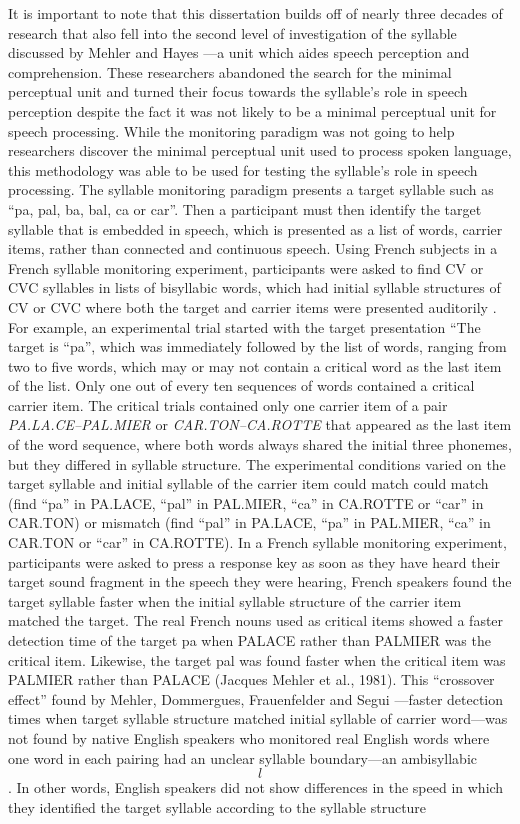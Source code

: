 It is important to note that this dissertation builds off of nearly three decades of research that also fell into the second level of investigation of the syllable discussed by Mehler and Hayes \parencite*{Mehler1981-wp}---a unit which aides speech perception and comprehension. These researchers abandoned the search for the minimal perceptual unit and turned their focus towards the syllable’s role in speech perception despite the fact it was not likely to be a minimal perceptual unit for speech processing. While the monitoring paradigm was not going to help researchers discover the minimal perceptual unit used to process spoken language, this methodology was able to be used for testing the syllable’s role in speech processing. The syllable monitoring paradigm presents a target syllable such as “pa, pal, ba, bal, ca or car”. Then a participant must then identify the target syllable that is embedded in speech, which is presented as a list of words, carrier items, rather than connected and continuous speech. Using French subjects in a French syllable monitoring experiment, participants were asked to find CV or CVC syllables in lists of bisyllabic words, which had initial syllable structures of CV or CVC where both the target and carrier items were presented auditorily \parencite{Mehler1981-vi}. For example, an experimental trial started with the target presentation “The target is “pa”, which was immediately followed by the list of words, ranging from two to five words, which may or may not contain a critical word as the last item of the list. Only one out of every ten sequences of words contained a critical carrier item. The critical trials contained only one carrier item of a pair \emph{PA.LA.CE–PAL.MIER} or \emph{CAR.TON–CA.ROTTE} that appeared as the last item of the word sequence, where both words always shared the initial three phonemes, but they differed in syllable structure. The experimental conditions varied on the target syllable and initial syllable of the carrier item could match could match (find “pa” in PA.LACE, “pal” in PAL.MIER, “ca” in CA.ROTTE or “car” in CAR.TON) or mismatch (find “pal” in PA.LACE, “pa” in PAL.MIER, “ca” in CAR.TON or “car” in CA.ROTTE).  In a French syllable monitoring experiment, participants were asked to press a response key as soon as they have heard their target sound fragment in the speech they were hearing, French speakers found the target syllable faster when the initial syllable structure of the carrier item matched the target. The real French nouns used as critical items showed a faster detection time of the target pa when PALACE rather than PALMIER was the critical item. Likewise, the target pal was found faster when the critical item was  PALMIER rather than PALACE (Jacques Mehler et al., 1981). This “crossover effect” found by Mehler, Dommergues, Frauenfelder and Segui \parencite*{Mehler1981-vi}---faster detection times when target syllable structure matched initial syllable of carrier word---was not found by native English speakers who monitored real English words where one word in each pairing had an unclear syllable boundary---an ambisyllabic \[l\] \parencite{Cutler1986-zl}. In other words, English speakers did not show differences in the speed in which they identified the target syllable according to the syllable structure 